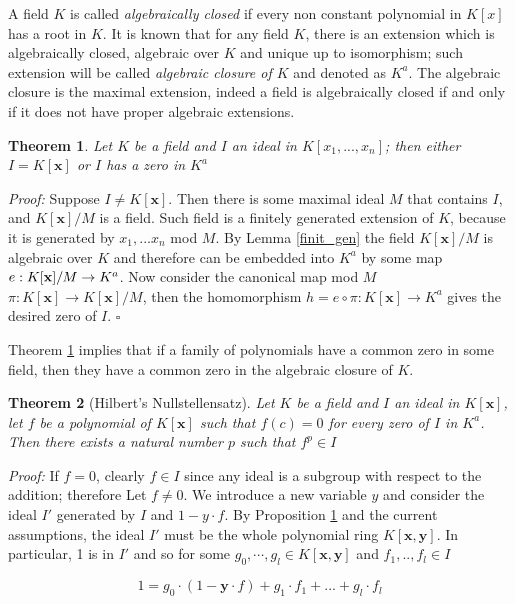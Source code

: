 \documentclass[a4paper,12pt,oneside]{book}
\newtheorem{theorem}{Theorem}[chapter]
\newcommand*{\QED}{\hfill\ensuremath{\square}}
\begin{document}
A field $K$ is called \textit{algebraically closed} if every non constant polynomial in $K[x]$ has a root in $K$. It is known that for any field $K$, there is an extension which is algebraically closed, algebraic over $K$ and unique up to isomorphism;  such extension will be called \textit{algebraic closure of $K$} and denoted as $K^a$. The algebraic closure is the maximal extension, indeed a field is algebraically closed if and only if it does not have proper algebraic extensions. 

\begin{theorem}\label{zeros}
Let $K$ be a field and $I$ an ideal in $K[x_1,...,x_n]$; then either $I=K[\mathbf{x}]$ or $I$ has a zero in $K^a$
\end{theorem}

\textit{Proof:}
Suppose $I\neq K[\mathbf{x}]$. Then there is some maximal ideal $M$ that contains $I$, and $K[\mathbf{x}]/M$ is a field. Such field is a finitely generated extension of $K$, because it is generated by $x_1, ... x_n$ mod $M$. By Lemma \ref{finit_gen} the field $K[\mathbf{x}]/M$ is algebraic over $K$ and therefore can be embedded into $K^a$ by some map $e:K[\mathbf{x}]/M \rightarrow\nobreak K^a$. Now consider the canonical map mod $M$  $\pi : K[\mathbf{x}] \rightarrow K[\mathbf{x}]/M$, then the homomorphism $h=e\circ\pi : K[\mathbf{x}]\rightarrow K^a$ gives the desired zero of $I$. \QED

Theorem \ref{zeros} implies that if a family of polynomials have a common zero in some field, then they have a common zero in the algebraic closure of $K$. 

\begin{theorem}[Hilbert's Nullstellensatz]\label{langsnulls}
Let $K$ be a field and $I$ an ideal in $K[\mathbf{x}]$, let $f$ be a polynomial of $K[\mathbf{x}]$ such that $f(c)=0$ for every zero of $I$ in $K^a$. Then there exists a natural number $p$ such that $f^p\in I$
\end{theorem}

\textit{Proof:} If $f=0$, clearly $f\in I$ since any ideal is a subgroup with respect to the addition; therefore  Let $f\neq 0$. We introduce a new variable $y$ and consider the ideal $I'$ generated by $I$ and $1-y\cdot f$. By Proposition \ref{zeros} and the current assumptions, the ideal $I'$ must be the whole polynomial ring $K[\mathbf{x},\mathbf{y}]$. In particular, 1 is in $I'$ and so for some $g_0,\cdots,g_l\in K[\mathbf{x},\mathbf{y}]$ and $f_1,..,f_l\in I$

$$ 1= g_0 \cdot (1-\mathbf{y}\cdot f) + g_1\cdot f_1 + ...+ g_l\cdot f_l  $$ 
\end{document}
